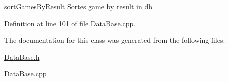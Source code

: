 sort\-Games\-By\-Result Sortes game by result in db 



Definition at line 101 of file Data\-Base.\-cpp.



The documentation for this class was generated from the following files\-:\begin{DoxyCompactItemize}
\item 
\hyperlink{_data_base_8h}{Data\-Base.\-h}\item 
\hyperlink{_data_base_8cpp}{Data\-Base.\-cpp}\end{DoxyCompactItemize}
